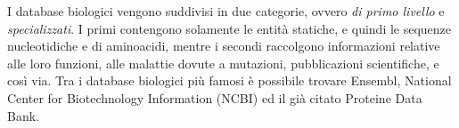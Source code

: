 I database biologici vengono suddivisi in due categorie, ovvero \textit{di primo livello} e \textit{specializzati}. I primi contengono solamente le entità statiche, e quindi le sequenze nucleotidiche e di aminoacidi, mentre i secondi raccolgono informazioni relative alle loro funzioni, alle malattie dovute a mutazioni, pubblicazioni scientifiche, e così via.
\newline
Tra i database biologici più famosi è possibile trovare Ensembl\cite{ensembl}, National Center for Biotechnology Information (NCBI)\cite{NCBI} ed il già citato Proteine Data Bank\cite{proteineDataBank}.
